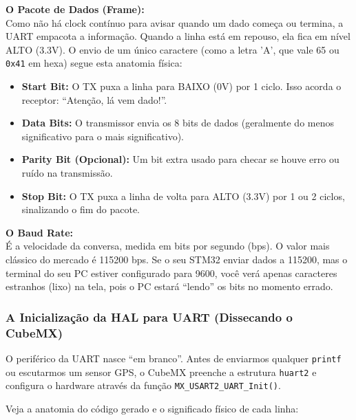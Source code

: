 \documentclass[12pt,a4paper]{article}
\begin{document}
\vspace{0.3cm}
\noindent\textbf{O Pacote de Dados (Frame):}\\
Como não há clock contínuo para avisar quando um dado começa ou termina, a UART empacota a informação. Quando a linha está em repouso, ela fica em nível ALTO (3.3V). O envio de um único caractere (como a letra 'A', que vale 65 ou \texttt{0x41} em hexa) segue esta anatomia física:



\begin{itemize}
    \item \textbf{Start Bit:} O TX puxa a linha para BAIXO (0V) por 1 ciclo. Isso acorda o receptor: ``Atenção, lá vem dado!''.
    \item \textbf{Data Bits:} O transmissor envia os 8 bits de dados (geralmente do menos significativo para o mais significativo).
    \item \textbf{Parity Bit (Opcional):} Um bit extra usado para checar se houve erro ou ruído na transmissão.
    \item \textbf{Stop Bit:} O TX puxa a linha de volta para ALTO (3.3V) por 1 ou 2 ciclos, sinalizando o fim do pacote.
\end{itemize}

\vspace{0.3cm}
\noindent\textbf{O Baud Rate:}\\
É a velocidade da conversa, medida em bits por segundo (bps). O valor mais clássico do mercado é 115200 bps. Se o seu STM32 enviar dados a 115200, mas o terminal do seu PC estiver configurado para 9600, você verá apenas caracteres estranhos (lixo) na tela, pois o PC estará ``lendo'' os bits no momento errado.

\subsubsection{A Inicialização da HAL para UART (Dissecando o CubeMX)}
O periférico da UART nasce ``em branco''. Antes de enviarmos qualquer \texttt{printf} ou escutarmos um sensor GPS, o CubeMX preenche a estrutura \texttt{huart2} e configura o hardware através da função \texttt{MX\_USART2\_UART\_Init()}.

Veja a anatomia do código gerado e o significado físico de cada linha:
\end{document}
